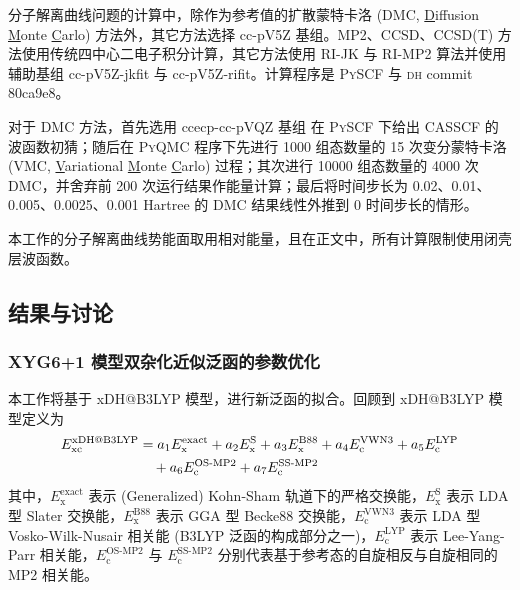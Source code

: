 分子解离曲线问题的计算中，除作为参考值的扩散蒙特卡洛 (DMC, \underline{D}iffusion \underline{M}onte \underline{C}arlo) 方法外，其它方法选择 cc-pV5Z 基组\cite{Dunning-Dunning.JCP.1989}。MP2、CCSD、CCSD(T) 方法使用传统四中心二电子积分计算，其它方法使用 RI-JK 与 RI-MP2 算法并使用辅助基组 cc-pV5Z-jkfit\cite{Weigend-Weigend.PCCP.2002} 与 cc-pV5Z-rifit\cite{10.1039/b415208e}。计算程序是 \textsc{PySCF} 与 \textsc{dh} commit 80ca9e8。

对于 DMC 方法，首先选用 ccecp-cc-pVQZ 基组\cite{Bennett-Mitas.JCP.2017} 在 \textsc{PySCF} 下给出 CASSCF 的波函数初猜；随后在 \textsc{PyQMC} 程序\cite{Wheeler-Wagner.JCP.2023}下先进行 1000 组态数量的 15 次变分蒙特卡洛 (VMC, \underline{V}ariational \underline{M}onte \underline{C}arlo) 过程；其次进行 10000 组态数量的 4000 次 DMC，并舍弃前 200 次运行结果作能量计算；最后将时间步长为 0.02、0.01、0.005、0.0025、0.001 Hartree 的 DMC 结果线性外推到 0 时间步长的情形。

本工作的分子解离曲线势能面取用相对能量，且在正文中，所有计算限制使用闭壳层波函数。

\subsection{结果与讨论}
\label{sec.iepa-results}

\subsubsection{XYG6+1 模型双杂化近似泛函的参数优化}

本工作将基于 xDH@B3LYP 模型\cite{Zhang-Xu.JPCL.2021}，进行新泛函的拟合。回顾到 xDH@B3LYP 模型定义为
\begin{align}
  E_\mathrm{xc}^\text{xDH@B3LYP} &= a_1 E_\mathrm{x}^\mathrm{exact} + a_2 E_\mathrm{x}^\mathrm{S} + a_3 E_\mathrm{x}^\mathrm{B88} + a_4 E_\mathrm{c}^\mathrm{VWN3} + a_5 E_\mathrm{c}^\mathrm{LYP} \notag \\
  &\quad + a_6 E_\mathrm{c}^\text{OS-MP2} + a_7 E_\mathrm{c}^\text{SS-MP2}
\end{align}
其中，$E_\mathrm{x}^\mathrm{exact}$ 表示 (Generalized) Kohn-Sham 轨道下的严格交换能，$E_\mathrm{x}^\mathrm{S}$ 表示 LDA 型 Slater 交换能\cite{Bloch-Bloch.ZP.1929,Dirac-Dirac.MPCPS.1930}，$E_\mathrm{x}^\mathrm{B88}$ 表示 GGA 型 Becke88 交换能\cite{Becke-Becke.PRA.1988}，$E_\mathrm{c}^\mathrm{VWN3}$ 表示 LDA 型 Vosko-Wilk-Nusair 相关能\cite{Vosko-Nusair.CJP.1980} (B3LYP 泛函的构成部分之一\cite{Becke-Becke.JCP.1993,Stephens-Frisch.JPC.1994})，$E_\mathrm{c}^\mathrm{LYP}$ 表示 Lee-Yang-Parr 相关能\cite{Lee-Parr.PRB.1988}，$E_\mathrm{c}^\text{OS-MP2}$ 与 $E_\mathrm{c}^\text{SS-MP2}$ 分别代表基于参考态的自旋相反与自旋相同的 MP2 相关能。

